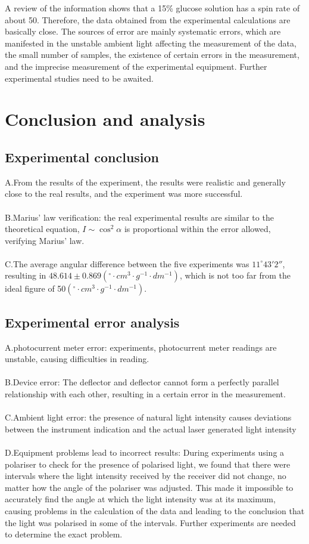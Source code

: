 \documentclass[UTF8]{article}
\begin{document}
A review of the information shows that a 15\% glucose solution has a spin rate of about 50. Therefore, the data obtained from the experimental calculations are basically close. The sources of error are mainly systematic errors, which are manifested in the unstable ambient light affecting the measurement of the data, the small number of samples, the existence of certain errors in the measurement, and the imprecise measurement of the experimental equipment. Further experimental studies need to be awaited.


\section{Conclusion and analysis}
\subsection{Experimental conclusion}
A.From the results of the experiment, the results were realistic and generally close to the real results, and the experiment was more successful.\\
\\
B.Marius' law verification: the real experimental results are similar to the theoretical equation, $I\sim \cos ^{2} \alpha $ is proportional within the error allowed, verifying Marius' law.\\
\\
C.The average angular difference between the five experiments was $11 ^{\circ} {43}'{2}''$, resulting in $48.614\pm 0.869\left ( ^{\circ} \cdot cm^{3} \cdot g^{-1} \cdot dm^{-1} \right )$, which is not too far from the ideal figure of 50$\left ( ^{\circ} \cdot cm^{3} \cdot g^{-1} \cdot dm^{-1} \right )$.


\subsection{Experimental error analysis}
A.photocurrent meter error: experiments, photocurrent meter readings are unstable, causing difficulties in reading.\\
\\
B.Device error: The deflector and deflector cannot form a perfectly parallel relationship with each other, resulting in a certain error in the measurement.\\
\\
C.Ambient light error: the presence of natural light intensity causes deviations between the instrument indication and the actual laser generated light intensity\\
\\
D.Equipment problems lead to incorrect results: During experiments using a polariser to check for the presence of polarised light, we found that there were intervals where the light intensity received by the receiver did not change, no matter how the angle of the polariser was adjusted. This made it impossible to accurately find the angle at which the light intensity was at its maximum, causing problems in the calculation of the data and leading to the conclusion that the light was polarised in some of the intervals. Further experiments are needed to determine the exact problem.

	
\end{document}

